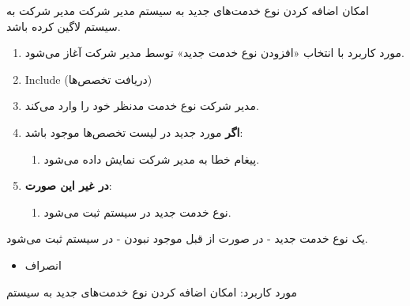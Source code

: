 \usecase
{امکان اضافه کردن نوع خدمت‌های جدید به سیستم}
{}
{}
{مدیر شرکت}
{}
{مدیر شرکت به سیستم لاگین کرده باشد.}
{
	\vspace*{-0.6cm}
	\begin{enumerate}
		\item 
		مورد کاربرد با انتخاب «افزودن نوع خدمت جدید» توسط مدیر شرکت آغاز می‌شود.
		\item Include (دریافت تخصص‌ها)
		\item مدیر شرکت نوع خدمت مدنظر خود را وارد می‌کند. 
		\item
		\textbf{اگر}
		مورد جدید در لیست تخصص‌ها موجود باشد:
		\begin{enumerate}[label=\theenumi.\arabic*.]
			\item پیغام خطا به مدیر شرکت نمایش داده می‌شود.
		\end{enumerate}
		\item
		\textbf{در غیر این صورت}:
		\begin{enumerate}[label=\theenumi.\arabic*.]
			\item نوع خدمت جدید در سیستم ثبت می‌شود.
		\end{enumerate}		
	\end{enumerate}
}
{یک نوع خدمت جدید - در صورت از قبل موجود نبودن - در سیستم ثبت می‌شود.}
{
	\begin{itemize}
		\vspace*{-0.6cm}
		\item انصراف
	\end{itemize}
}
{
	مورد کاربرد: امکان اضافه کردن نوع خدمت‌های جدید به سیستم
}


